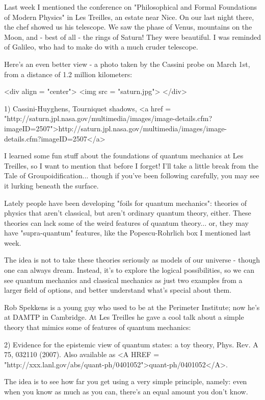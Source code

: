 


Last week I mentioned the conference on "Philosophical and
Formal Foundations of Modern Physics" in Les Treilles, an estate
near Nice.  On our last night there, the chef showed us his 
telescope.  We saw the phase of Venus, mountains on the Moon, 
and - best of all - the rings of Saturn!  They were beautiful.  
I was reminded of Galileo, who had to make do with a much cruder
telescope.

Here's an even better view - a photo taken by the Cassini probe
on March 1st, from a distance of 1.2 million kilometers:

<div align = "center">
<img src = "saturn.jpg">
</div>

1) Cassini-Huyghens, Tourniquet shadows,
<a href = "http://saturn.jpl.nasa.gov/multimedia/images/image-details.cfm?imageID=2507">http://saturn.jpl.nasa.gov/multimedia/images/image-details.cfm?imageID=2507</a>

I learned some fun stuff about the foundations of quantum mechanics
at Les Treilles, so I want to mention that before I forget!
I'll take a little break from the Tale of Groupoidification... though
if you've been following carefully, you may see it lurking beneath the
surface.

Lately people have been developing "foils for quantum mechanics":
theories of physics that aren't classical, but aren't ordinary 
quantum theory, either.  These theories can lack some of the 
weird features of quantum theory... or, they may have "supra-quantum"
features, like the Popescu-Rohrlich box I mentioned last week.   

The idea is not to take these theories seriously as models of our 
universe - though one can always dream.  Instead, it's to explore 
the logical possibilities, so we can see quantum mechanics and 
classical mechanics as just two examples from a larger field of
options, and better understand what's special about them.

Rob Spekkens is a young guy who used to be at the Perimeter Institute;
now he's at DAMTP in Cambridge.  At Les Treilles he gave a cool talk
about a simple theory that mimics some of features of quantum mechanics:

2) Evidence for the epistemic view of quantum states: a toy theory,
Phys. Rev. A 75, 032110 (2007).  Also available as <A HREF = "http://xxx.lanl.gov/abs/quant-ph/0401052">quant-ph/0401052</A>.

The idea is to see how far you get using a very simple principle, 
namely: even when you know as much as you can, there's an equal 
amount you don't know.

